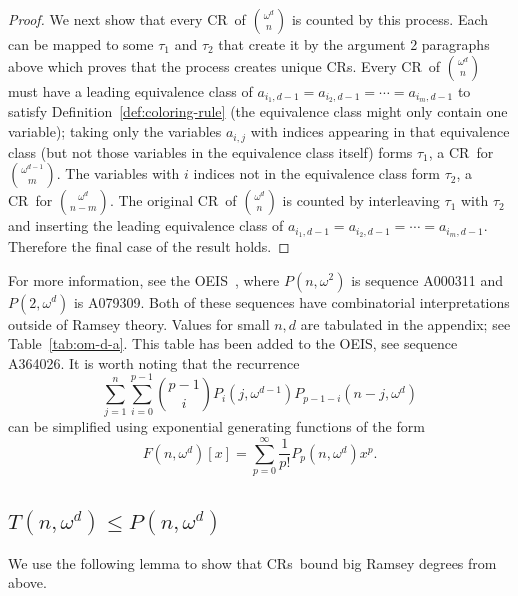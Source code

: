 \documentclass[10pt,a4paper]{article}
\newcommand{\om}{\omega}
\newcommand{\crulenospace}{CR}
\newcommand{\crule}{\crulenospace~}
\newcommand{\crules}{\crulenospace s~}
\newcommand{\crulesnospace}{\crulenospace s}
\newcommand{\numpoints}{n}
\newcommand{\inumpoints}{i}
\newcommand{\idegr}{j}
\newcommand{\commonconst}{a}
\theoremstyle{plain}
\theoremstyle{definition}
\begin{document}
\begin{proof}
We next show that every \crule of $\binom{\om^d}{\numpoints}$ is counted by this process. Each can be mapped to some $\tau_1$ and $\tau_2$ that create it by the argument 2 paragraphs above which proves that the process creates unique \crulesnospace. Every \crule of $\binom{\om^d}{\numpoints}$ must have a leading equivalence class of $\commonconst_{\inumpoints_1,d-1} = \commonconst_{\inumpoints_2,d-1} = \cdots = \commonconst_{\inumpoints_m,d-1}$ to 
satisfy Definition~\ref{def:coloring-rule} 
(the equivalence class might only contain one variable); taking only the variables $\commonconst_{\inumpoints,\idegr}$ with indices appearing in that equivalence class (but not those variables in the equivalence class itself) forms $\tau_1$, a \crule for $\binom{\om^{d-1}}{m}$. The variables with $\inumpoints$ indices not in the equivalence class form $\tau_2$, a \crule for $\binom{\om^d}{\numpoints-m}$. The original \crule of $\binom{\om^d}{\numpoints}$ is counted by interleaving $\tau_1$ with $\tau_2$ and inserting the leading equivalence class of $\commonconst_{\inumpoints_1,d-1} = \commonconst_{\inumpoints_2,d-1} = \cdots = \commonconst_{\inumpoints_m,d-1}$.
Therefore the final case of the result holds.
\end{proof}

For more information, see the OEIS~\cite{OEIS}, where $P(\numpoints,\om^2)$ is sequence A000311 and $P(2,\om^d)$ is A079309. Both of these
sequences have combinatorial interpretations outside of Ramsey
theory.
Values for small $\numpoints,d$ are tabulated in the appendix; see Table~\ref{tab:om-d-a}. This table has been added to the OEIS, see sequence A364026. It is worth noting that the recurrence $$
\sum\limits_{j=1}^\numpoints \sum\limits_{i=0}^{p-1} \binom{p-1}{i} P_i \left( j,\om^{d-1} \right) P_{p-1-i} \left( \numpoints-j,\om^d\right)
$$ can be simplified using exponential generating functions of the form $$
F(n,\om^d)[x] = \sum_{p=0}^\infty \frac{1}{p!} P_p(n,\om^d) x^p.
$$

\subsection{\texorpdfstring{$T(\numpoints,\om^d) \leq P(\numpoints,\om^d)$}
 {T(\numpoints, omega d) <= P(\numpoints, omega d)}}

We use the following lemma to show that \crules bound big Ramsey degrees from above.
\end{document}
